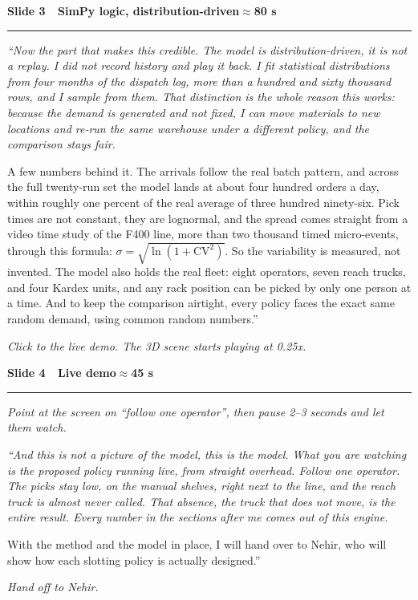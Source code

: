 \documentclass[11pt]{article}
\newcommand{\slidehdr}[2]{%
  \par\medskip
  {\color{navy}\large\bfseries #1}\hfill{\color{green}\bfseries #2}\par
  {\color{navy}\rule{\linewidth}{1.1pt}}\par\smallskip}
\newcommand{\cue}[1]{\par{\color{grey}\small\itshape #1}\par\smallskip}
\newenvironment{say}{\par\begingroup\fontsize{12.5}{16}\selectfont\itshape}{\endgroup\par\medskip}
\begin{document}
\slidehdr{Slide 3 \,\textbullet\, SimPy logic, distribution-driven}{\(\approx\)80 s}
\begin{say}
``Now the part that makes this credible. The model is distribution-driven, it is not a
replay. I did not record history and play it back. I fit statistical distributions from
four months of the dispatch log, more than a hundred and sixty thousand rows, and I
sample from them. That distinction is the whole reason this works: because the demand is
generated and not fixed, I can move materials to new locations and re-run the same
warehouse under a different policy, and the comparison stays fair.

A few numbers behind it. The arrivals follow the real batch pattern, and across the full
twenty-run set the model lands at about four hundred orders a day, within roughly one
percent of the real average of three hundred ninety-six. Pick times are not constant,
they are lognormal, and the spread comes straight from a video time study of the F400
line, more than two thousand timed micro-events, through this formula:
\(\sigma=\sqrt{\ln\!\left(1+\mathrm{CV}^{2}\right)}\). So the variability is measured,
not invented. The model also holds the real fleet: eight operators, seven reach trucks,
and four Kardex units, and any rack position can be picked by only one person at a time.
And to keep the comparison airtight, every policy faces the exact same random demand,
using common random numbers.''
\end{say}
\cue{Click to the live demo. The 3D scene starts playing at 0.25x.}

\slidehdr{Slide 4 \,\textbullet\, Live demo}{\(\approx\)45 s}
\cue{Point at the screen on ``follow one operator'', then pause 2--3 seconds and let them watch.}
\begin{say}
``And this is not a picture of the model, this is the model. What you are watching is
the proposed policy running live, from straight overhead. Follow one operator. The picks
stay low, on the manual shelves, right next to the line, and the reach truck is almost
never called. That absence, the truck that does not move, is the entire result. Every
number in the sections after me comes out of this engine.

With the method and the model in place, I will hand over to Nehir, who will show how
each slotting policy is actually designed.''
\end{say}
\cue{Hand off to Nehir.}
\end{document}
